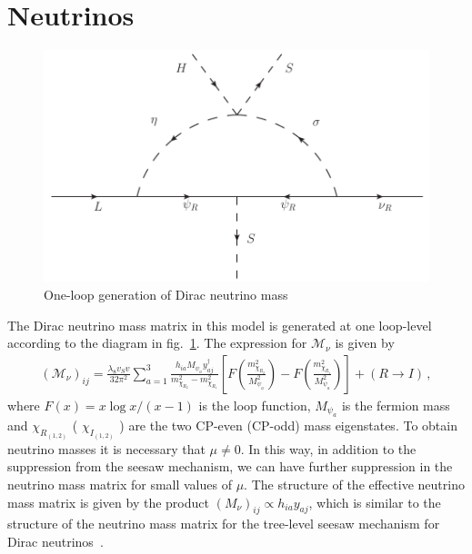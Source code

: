 \documentclass[12pt]{article}
\begin{document}
\section{Neutrinos}
\label{sec:Neutrinos}
%
\begin{figure}
\centering
\includegraphics[scale=0.75]{Neutrino_Loop.pdf}
\caption{One-loop generation of Dirac neutrino mass}
\label{fig:zee}
\end{figure}
%
 The Dirac neutrino mass matrix in this model is generated at one loop-level according to the diagram in  fig.~\ref{fig:zee}. The expression for $\mathcal{M}_{\nu}$ is given by~\cite{Reig:2018mdk}
%
\begin{align}
(\mathcal{M}_{\nu})_{ij} = \frac{\lambda_8 v_S v}{32 \pi^{2}} \sum_{a=1}^{3} \frac{h_{i a} M_{\psi_{a}}y^{\dagger}_{a j}} {m_{\chi_{R_2}}^{2}-m_{\chi_{R_1}}^{2}} \left[ F\left( \frac{m_{\chi_{R_2}}^{2}}{M_{\psi_{a}}^{2}} \right) - F\left( \frac{m_{\chi_{R_1}}^{2}}{M_{\psi_{a}}^{2}} \right) \right] + (R \to I)\,,
\end{align}
%
where $F(x) =x \log x/(x-1)$ is the loop function, $M_{\psi_{a}}$ is
the fermion mass and $\chi_{R_{(1,2)}}$ ( $\chi_{I_{(1,2)}}$ ) are the
two CP-even (CP-odd) mass eigenstates.
To obtain neutrino masses it is necessary that $\mu \neq 0$. In this
way, in addition to the suppression from the seesaw mechanism, we can
have further suppression in the neutrino mass matrix for small values
of $\mu$.
The structure of the effective neutrino mass matrix is given by the
product $(M_{\nu})_{ij} \propto h_{i a} y_{a j}$, which is similar to
the structure of the neutrino mass matrix for the tree-level seesaw
mechanism for Dirac neutrinos~\cite{Chulia:2016ngi}. 
\end{document}
